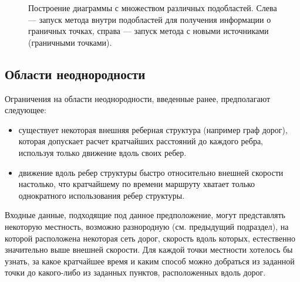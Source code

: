 \documentclass[12pt]{article}
\begin{document}
\begin{figure}
\begin{center}
\end{center}
\caption{Построение диаграммы с множеством различных подобластей. 
Слева --- запуск метода внутри подобластей
для получения информации о граничных точках, справа --- запуск метода
с новыми источниками (граничными точками).}
\label{multi_type_fig}
\end{figure}

\subsection{Области неоднородности}
Ограничения на области неоднородности, введенные ранее, предполагают следующее:
\begin{itemize}
\item существует некоторая внешняя реберная структура (например граф дорог), 
которая допускает расчет кратчайших расстояний до каждого ребра, используя
только движение вдоль своих ребер.
\item движение вдоль ребер структуры быстро относительно внешней скорости 
настолько, что кратчайшему по времени маршруту хватает только однократного использования
ребер структуры.
\end{itemize}
Входные данные, подходящие под данное предположение, могут представлять
некоторую местность, возможно разнородную (см. предыдущий подраздел), на которой
расположена некоторая сеть дорог, скорость вдоль которых, естественно
значительно выше внешней скорости. Для каждой точки местности хотелось бы
узнать, за какое кратчайшее время и каким способ можно добраться 
из заданной точки до какого-либо из заданных пунктов, расположенных вдоль дорог.
\end{document}
